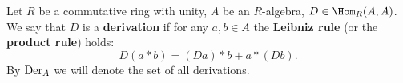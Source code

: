 \begin{definition}
  Let
    $R$ be a commutative ring with unity,
    $A$ be an $R$-algebra,
    $D \in \Hom_R(A, A)$.
  We say that $D$ is a \textbf{derivation} if for any $a, b \in A$ the
  \textbf{Leibniz rule} (or the \textbf{product rule}) holds:
  \begin{equation}
    D(a * b) = (D a) * b + a * (D b).
  \end{equation}
  By ${\rm Der}_A$ we will denote the set of all derivations.
\end{definition}
